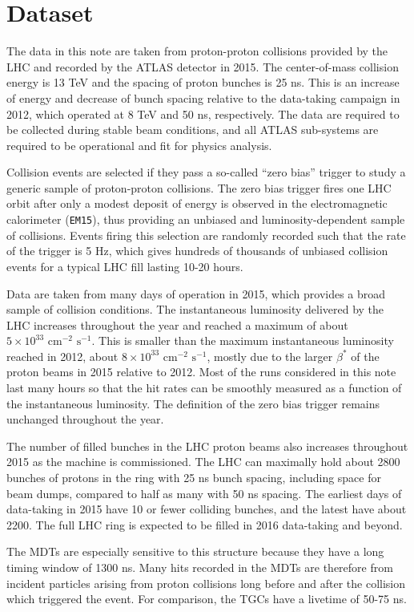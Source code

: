 \section{Dataset}
\label{sec:dataset}

The data in this note are taken from proton-proton collisions provided by the LHC and recorded by the ATLAS detector in 2015. The center-of-mass collision energy is 13 TeV and the spacing of proton bunches is 25 ns. This is an increase of energy and decrease of bunch spacing relative to the data-taking campaign in 2012, which operated at 8 TeV and 50 ns, respectively. The data are required to be collected during stable beam conditions, and all ATLAS sub-systems are required to be operational and fit for physics analysis.

Collision events are selected if they pass a so-called ``zero bias'' trigger to study a generic sample of proton-proton collisions. The zero bias trigger fires one LHC orbit after only a modest deposit of energy is observed in the electromagnetic calorimeter (\texttt{EM15}), thus providing an unbiased and luminosity-dependent sample of collisions. Events firing this selection are randomly recorded such that the rate of the trigger is 5 Hz, which gives hundreds of thousands of unbiased collision events for a typical LHC fill lasting 10-20 hours.

Data are taken from many days of operation in 2015, which provides a broad sample of collision conditions. The instantaneous luminosity delivered by the LHC increases throughout the year and reached a maximum of about $5\times10^{33} \text{ cm}^{-2} \text{ s}^{-1}$. This is smaller than the maximum instantaneous luminosity reached in 2012, about $8\times10^{33} \text{ cm}^{-2} \text{ s}^{-1}$, mostly due to the larger $\beta^\ast$ of the proton beams in 2015 relative to 2012. Most of the runs considered in this note last many hours so that the hit rates can be smoothly measured as a function of the instantaneous luminosity. The definition of the zero bias trigger remains unchanged throughout the year.

The number of filled bunches in the LHC proton beams also increases throughout 2015 as the machine is commissioned. The LHC can maximally hold about 2800 bunches of protons in the ring with 25 ns bunch spacing, including space for beam dumps, compared to half as many with 50 ns spacing. The earliest days of data-taking in 2015 have 10 or fewer colliding bunches, and the latest have about 2200. The full LHC ring is expected to be filled in 2016 data-taking and beyond.

The MDTs are especially sensitive to this structure because they have a long timing window of 1300 ns. Many hits recorded in the MDTs are therefore from incident particles arising from proton collisions long before and after the collision which triggered the event. For comparison, the TGCs have a livetime of 50-75 ns.




